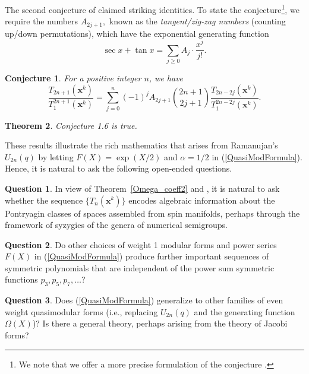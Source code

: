 \documentclass[11pt]{amsart}
\newtheorem{theorem}{Theorem}[section]
\newtheorem{conjecture}[theorem]{Conjecture}
\theoremstyle{definition}
\newtheorem{question}{Question}
\theoremstyle{remark}
\numberwithin{equation}{section}
\begin{document}
The second conjecture of \cite{Fel} claimed striking identities. 
To state the conjecture\footnote{We note that we offer a more precise formulation of the conjecture  \cite[p. 62]{Fel}.}, we require the numbers $A_{2j+1},$ known as the \emph{tangent/zig-zag numbers} (counting up/down permutations), which have the exponential generating function
$$\sec x+\tan x= \sum_{j\geq0} A_j \cdot \frac{x^j}{j!}.$$


\begin{conjecture}{{}}  For a positive integer $n$, we have
$$\frac{T_{2n+1}(\pmb{x}^k)}{T_1^{2n+1}(\pmb{x}^k)}
= \sum_{j=0}^n (-1)^j A_{2j+1}\binom{2n+1}{2j+1} \frac{T_{2n-2j}(\pmb{x}^k)}{T_1^{2n-2j}(\pmb{x}^k)}.$$
\end{conjecture}

\begin{theorem}\label{Conjecture2} Conjecture 1.6 is true.
\end{theorem}

These results illustrate the rich mathematics that arises from Ramanujan's $U_{2n}(q)$ by
letting $F(X)=\exp(X/2)$ and
$\alpha=1/2$ in (\ref{QuasiModFormula}).
Hence, it is natural to ask the following open-ended questions.


\begin{question} In view of Theorem~\ref{Omega_coeff2} and \cite[Th. 1.4]{AGO}, it is natural to ask whether the sequence $\{T_n(\pmb{x}^k)\}$ encodes algebraic information about the 
Pontryagin classes \cite{Hitchin} of spaces assembled from spin manifolds, perhaps through the framework of syzygies of the genera of numerical semigroups.
\end{question}



\begin{question}
Do other choices of weight 1 modular forms and power series $F(X)$ in (\ref{QuasiModFormula}) produce further important sequences of symmetric polynomials that are independent of the power sum symmetric functions $p_3, p_5, p_7,\dots$?
\end{question}

\begin{question}
Does (\ref{QuasiModFormula}) generalize to other families of even weight quasimodular forms (i.e., replacing $U_{2n}(q)$ and the generating function $\Omega(X)$)? Is there a general theory, perhaps arising from the theory of Jacobi forms? 
\end{question}
\end{document}

